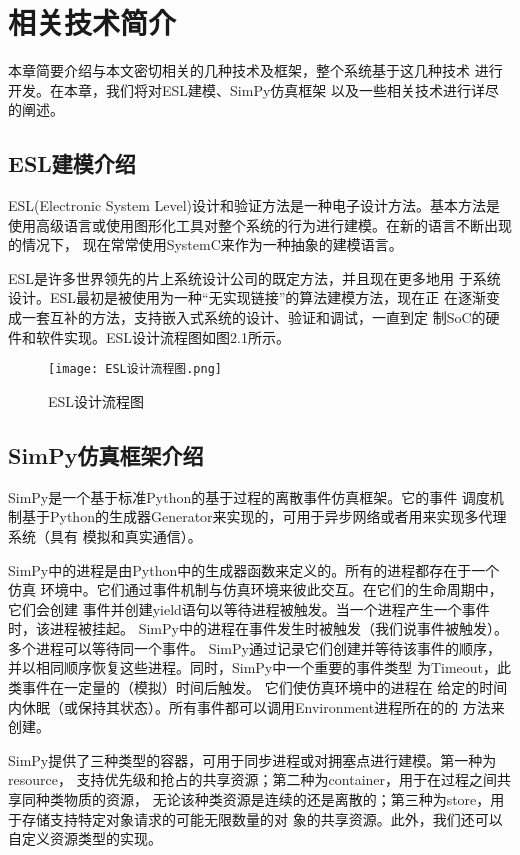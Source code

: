 
\chapter{相关技术简介}
本章简要介绍与本文密切相关的几种技术及框架，整个系统基于这几种技术
进行开发。在本章，我们将对ESL建模、SimPy仿真框架
以及一些相关技术进行详尽的阐述。

\section{ESL建模介绍}
ESL(Electronic System Level)设计和验证方法是一种电子设计方法。基本方法是
使用高级语言或使用图形化工具对整个系统的行为进行建模。在新的语言不断出现的情况下，
现在常常使用SystemC来作为一种抽象的建模语言。

ESL是许多世界领先的片上系统设计公司的既定方法，并且现在更多地用
于系统设计。ESL最初是被使用为一种“无实现链接”的算法建模方法，现在正
在逐渐变成一套互补的方法，支持嵌入式系统的设计、验证和调试，一直到定
制SoC的硬件和软件实现\cite{41}。ESL设计流程图\cite{42}如图2.1所示。

\begin{figure}
  \centering
  \texttt{[image: ESL设计流程图.png]}
  \caption{ESL设计流程图}
  \label{fig:badge}
\end{figure}

\section{SimPy仿真框架介绍}
SimPy是一个基于标准Python的基于过程的离散事件仿真框架。它的事件
调度机制基于Python的生成器Generator来实现的，可用于异步网络或者用来实现多代理系统（具有
模拟和真实通信）。

SimPy中的进程是由Python中的生成器函数来定义的。所有的进程都存在于一个仿真
环境中。它们通过事件机制与仿真环境来彼此交互。在它们的生命周期中，它们会创建
事件并创建yield语句以等待进程被触发。当一个进程产生一个事件时，该进程被挂起。
SimPy中的进程在事件发生时被触发（我们说事件被触发）。多个进程可以等待同一个事件。
SimPy通过记录它们创建并等待该事件的顺序，并以相同顺序恢复这些进程。同时，SimPy中一个重要的事件类型
为Timeout，此类事件在一定量的（模拟）时间后触发。 它们使仿真环境中的进程在
给定的时间内休眠（或保持其状态）。所有事件都可以调用Environment进程所在的的
方法来创建。

SimPy提供了三种类型的容器，可用于同步进程或对拥塞点进行建模。第一种为resource，
支持优先级和抢占的共享资源；第二种为container，用于在过程之间共享同种类物质的资源，
无论该种类资源是连续的还是离散的；第三种为store，用于存储支持特定对象请求的可能无限数量的对
象的共享资源。此外，我们还可以自定义资源类型的实现。

